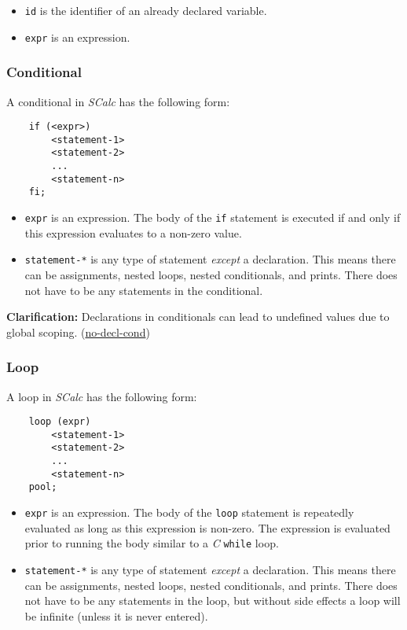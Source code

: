 \documentclass{article}
\newcommand{\code}[1]{\texttt{\textmd{#1}}}
\newcommand{\clarification}[2]{\textbf{Clarification: }#1 (\hyperlink{#2}{#2})}
\begin{document}
\begin{itemize}
	\item \code{id} is the identifier of an already declared variable.
	\item \code{expr} is an expression.
\end{itemize}

\subsubsection{Conditional}
\label{sssec:conditional}
A conditional in \textit{SCalc} has the following form:
\begin{lstlisting}
	if (<expr>)
		<statement-1>
		<statement-2>
		...
		<statement-n>
	fi;
\end{lstlisting}

\begin {itemize}
	\item
    \code{expr} is an expression. The body of the \code{if} statement is executed if and only if
    this expression evaluates to a non-zero value.
	\item
    \code{statement-*} is any type of statement \textit{except} a declaration. This means there can
    be assignments, nested loops, nested conditionals, and prints. There does not have to be any
    statements in the conditional.
\end{itemize}

\clarification{Declarations in conditionals can lead to undefined values due to global scoping.}
{no-decl-cond}

\subsubsection{Loop}
\label{sssec:loop}
A loop in \textit{SCalc} has the following form:
\begin{lstlisting}
	loop (expr)
		<statement-1>
		<statement-2>
		...
		<statement-n>
	pool;
\end{lstlisting}

\begin {itemize}
	\item
  \code{expr} is an expression. The body of the \code{loop} statement is repeatedly evaluated as
  long as this expression is non-zero. The expression is evaluated prior to running the body
  similar to a \textit{C} \code{while} loop.
	\item
    \code{statement-*} is any type of statement \textit{except} a declaration. This means there can
    be assignments, nested loops, nested conditionals, and prints. There does not have to be any
    statements in the loop, but without side effects a loop will be infinite (unless it is never
    entered).
\end{itemize}
\end{document}
